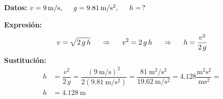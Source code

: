 \documentclass[14pt]{extarticle}
\begin{document}
\begin{enumerate}
\textbf{Datos: } $v = \SI{9}{\meter\per\second}, \hspace{0.5cm} g = \SI{9.81}{\meter\per\square\second}, \hspace{0.5cm} h = \, ?$

\textbf{Expresión: }
\begin{align*}
v = \sqrt{2 \, g \, h} \hspace{0.5cm} \Rightarrow \hspace{0.5cm} v^{2} = 2 \, g \, h \hspace{0.5cm} \Rightarrow \hspace{0.5cm} h = \dfrac{v^{2}}{2 \, g}
\end{align*}
\textbf{Sustitución: }
\begin{align*}
h &= \dfrac{v^{2}}{2 \, g} = \dfrac{\left( \displaystyle \SI[per-mode=fraction]{9}{\meter\per\second} \right)^{2}}{2 \left( \displaystyle \SI[per-mode=fraction]{9.81}{\meter\per\square\second} \right)} = \dfrac{\displaystyle \SI[per-mode=fraction]{81}{\square\meter\per\square\second}}{\displaystyle \SI[per-mode=fraction]{19.62}{\meter\per\square\second}} = \num{4.128} \dfrac{\unit{\square\meter\square\second}}{\unit{\meter\square\second}} = \\[0.5em]
h &= \SI{4.128}{\meter}
\end{align*}
\end{enumerate}
\end{document}
